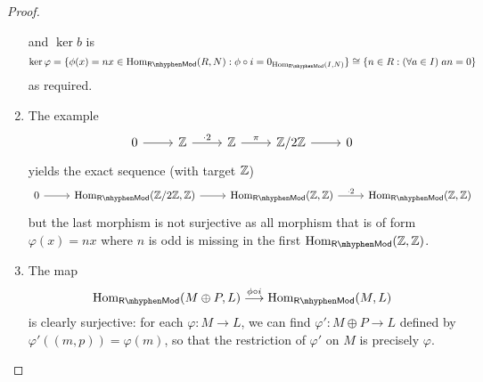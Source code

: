 \begin{proof}
\begin{enumerate}[label=(\roman*)]
    and $\ker b$ is
    \[
    \ker \varphi = \{\phi(x)=nx \in \Hom_\mathsf{R\mhyphen Mod}(R, N): \phi \circ i = 0_{\Hom_\mathsf{R\mhyphen Mod}(I, N)}\} \cong \{n \in R: (\forall a \in I)\; an = 0\}
    \]
    as required.
    \item The example
    \[
    \begin{tikzcd}
    0 \arrow[r] &\Z \arrow[r, "\cdot 2"] &\Z \arrow[r, "\pi"] &\Z/2\Z \arrow[r] &0
    \end{tikzcd}
    \]
    yields the exact sequence (with target $\mathbb{Z}$)
    \[
    \begin{tikzcd}
    0 \arrow[r] &\Hom_\mathsf{R\mhyphen Mod}(\Z/2\Z,\Z) \arrow[r] &\Hom_\mathsf{R\mhyphen Mod}(\Z,\Z) \arrow[r, "\cdot 2"] &\Hom_\mathsf{R\mhyphen Mod}(\Z,\Z)
    \end{tikzcd}
    \]
    but the last morphism is not surjective as all morphism that is of form $\varphi(x) = nx$ where $n$ is odd is missing in the first $\Hom_\mathsf{R\mhyphen Mod}(\Z,\Z)$.
    \item The map
    \[
    \Hom_\mathsf{R\mhyphen Mod}(M\oplus P,L) \overset{\phi \circ i}{\longrightarrow} \Hom_\mathsf{R\mhyphen Mod}(M,L)
    \]
    is clearly surjective: for each $\varphi: M \to L$, we can find $\varphi': M\oplus P \to L$ defined by $\varphi'((m,p)) = \varphi(m)$, so that the restriction of $\varphi'$ on $M$ is precisely $\varphi$.
\end{enumerate}
\end{proof}

